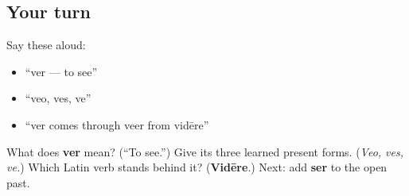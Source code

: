 \subsection*{Your turn}
Say these aloud:

\begin{itemize}
\raggedright
  \item “ver — to see”
  \item “veo, ves, ve”
  \item “ver comes through veer from vidēre”
\end{itemize}

\begin{tcolorbox}[breakable,colback=teal!4,colframe=teal!35!black,title={Before you move on}]
What does \textbf{ver} mean? (“To see.”) Give its three learned present forms. (\emph{Veo, ves, ve.}) Which Latin verb stands behind it? (\textbf{Vidēre}.) Next: add \textbf{ser} to the open past.
\end{tcolorbox}
